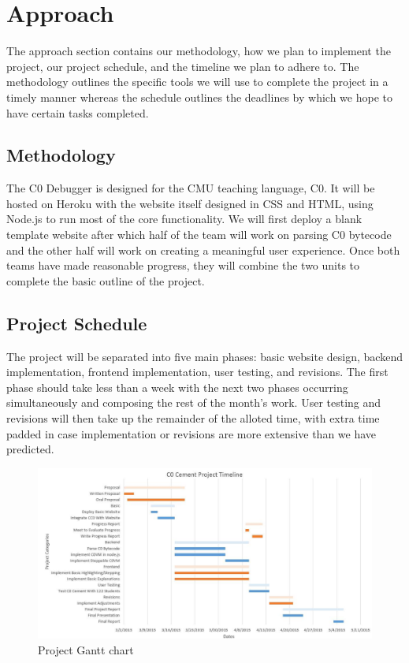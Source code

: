 \documentclass[11pt]{article}
\begin{document}
\section{Approach}
\par
The approach section contains our methodology, how we plan to implement the
project, our project schedule, and the timeline we plan to adhere to.  The
methodology outlines the specific tools we will use to complete the project in
a timely manner whereas the schedule outlines the deadlines by which we hope to
have certain tasks completed.

\subsection{Methodology}
The C0 Debugger is designed for the CMU teaching language, C0.  It will be
hosted on Heroku with the website itself designed in CSS and HTML, using
Node.js to run most of the core functionality.  We will first deploy a blank
template website after which half of the team will work on parsing C0 bytecode
and the other half will work on creating a meaningful user experience.  Once
both teams have made reasonable progress, they will combine the two units to
complete the basic outline of the project.

\subsection{Project Schedule}
The project will be separated into five main phases: basic website design,
backend implementation, frontend implementation, user testing, and revisions.
The first phase should take less than a week with the
next two phases occurring simultaneously and composing the rest of the month's
work.  User testing and revisions will then take up the
remainder of the alloted time, with extra time padded in case implementation or
revisions are more extensive than we have predicted.
\begin{figure}[h]
  \centering
  \includegraphics[width=\linewidth]{gantt.jpg}
  \caption{Project Gantt chart}
  \label{fig:gantt}
\end{figure}
\end{document}
